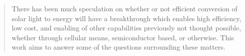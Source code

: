 
\begin{abstract}

There has been much speculation on whether or not efficient conversion of solar light to energy will have a breakthrough which enables high efficiency, low cost, and enabling of other capabilities previously not thought possible, whether through cellular means, semiconductor based, or otherwise. This work aims to answer some of the questions surrounding these matters.

\end{abstract}